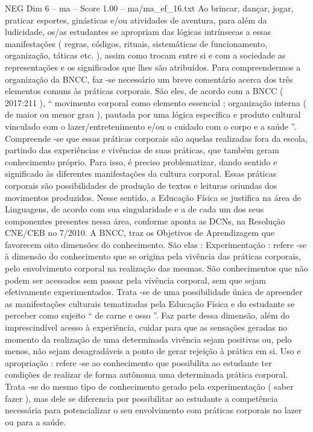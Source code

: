 \begin{textsample}{NEG Dim 6 – ma – Score 1.00 – ma/ma\_ef\_16.txt}
Ao brincar, dançar, jogar, praticar esportes, ginásticas e/ou atividades de aventura, para além da ludicidade, os/as estudantes se apropriam das lógicas intrínsecas a essas manifestações ( regras, códigos, rituais, sistemáticas de funcionamento, organização, táticas etc. ), assim como trocam entre si e com a sociedade as representações e os significados que lhes são atribuídos.
Para compreendermos a organização da BNCC, faz -se necessário um breve comentário acerca dos três elementos comuns às práticas corporais.
São eles, de acordo com a BNCC ( 2017:211 ), “ movimento corporal como elemento essencial ; organização interna ( de maior ou menor grau ), pautada por uma lógica específica e produto cultural vinculado com o lazer/entretenimento e/ou o cuidado com o corpo e a saúde ”.
Compreende -se que essas práticas corporais são aquelas realizadas fora da escola, partindo das experiências e vivências de suas práticas, que também geram conhecimento próprio.
Para isso, é preciso problematizar, dando sentido e significado às diferentes manifestações da cultura corporal.
Essas práticas corporais são possibilidades de produção de textos e leituras oriundas dos movimentos produzidos.
Nesse sentido, a Educação Física se justifica na área de Linguagens, de acordo com sua singularidade e a de cada um dos seus componentes presentes nessa área, conforme aponta as DCNs, na Resolução CNE/CEB no 7/2010.
A BNCC, traz os Objetivos de Aprendizagem que favorecem oito dimensões do conhecimento.
São elas : Experimentação : refere -se à dimensão do conhecimento que se origina pela vivência das práticas corporais, pelo envolvimento corporal na realização das mesmas.
São conhecimentos que não podem ser acessados sem passar pela vivência corporal, sem que sejam efetivamente experimentados.
Trata -se de uma possibilidade única de apreender as manifestações culturais tematizadas pela Educação Física e do estudante se perceber como sujeito “ de carne e osso ”.
Faz parte dessa dimensão, além do imprescindível acesso à experiência, cuidar para que as sensações geradas no momento da realização de uma determinada vivência sejam positivas ou, pelo menos, não sejam desagradáveis a ponto de gerar rejeição à prática em si.
Uso e apropriação : refere -se ao conhecimento que possibilita ao estudante ter condições de realizar de forma autônoma uma determinada prática corporal.
Trata -se do mesmo tipo de conhecimento gerado pela experimentação ( saber fazer ), mas dele se diferencia por possibilitar ao estudante a competência necessária para potencializar o seu envolvimento com práticas corporais no lazer ou para a saúde.

\end{textsample}

